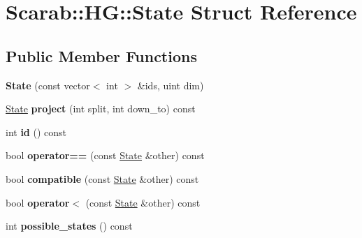 \hypertarget{structScarab_1_1HG_1_1State}{
\section{Scarab::HG::State Struct Reference}
\label{structScarab_1_1HG_1_1State}
}
\subsection*{Public Member Functions}
\begin{DoxyCompactItemize}
\item 
\hypertarget{structScarab_1_1HG_1_1State_a61592030e999341da1e674274db11307}{
{\bfseries State} (const vector$<$ int $>$ \&ids, uint dim)}
\label{structScarab_1_1HG_1_1State_a61592030e999341da1e674274db11307}

\item 
\hypertarget{structScarab_1_1HG_1_1State_a6597ae0951c6d0c9146ae6bd5b91b52f}{
\hyperlink{structScarab_1_1HG_1_1State}{State} {\bfseries project} (int split, int down\_\-to) const }
\label{structScarab_1_1HG_1_1State_a6597ae0951c6d0c9146ae6bd5b91b52f}

\item 
\hypertarget{structScarab_1_1HG_1_1State_ac7f5641edb1dd813dcac3b76be28d305}{
int {\bfseries id} () const }
\label{structScarab_1_1HG_1_1State_ac7f5641edb1dd813dcac3b76be28d305}

\item 
\hypertarget{structScarab_1_1HG_1_1State_a17d205eca9f3be9c01c7d41e3fe4d809}{
bool {\bfseries operator==} (const \hyperlink{structScarab_1_1HG_1_1State}{State} \&other) const }
\label{structScarab_1_1HG_1_1State_a17d205eca9f3be9c01c7d41e3fe4d809}

\item 
\hypertarget{structScarab_1_1HG_1_1State_acd8ef3e5bd73ec5034de0d70f2bb2492}{
bool {\bfseries compatible} (const \hyperlink{structScarab_1_1HG_1_1State}{State} \&other) const }
\label{structScarab_1_1HG_1_1State_acd8ef3e5bd73ec5034de0d70f2bb2492}

\item 
\hypertarget{structScarab_1_1HG_1_1State_abadb936b551a91d952af74b3bfc7d43d}{
bool {\bfseries operator$<$} (const \hyperlink{structScarab_1_1HG_1_1State}{State} \&other) const }
\label{structScarab_1_1HG_1_1State_abadb936b551a91d952af74b3bfc7d43d}

\item 
\hypertarget{structScarab_1_1HG_1_1State_afc65eeacc345b5396a673e4328cccc11}{
int {\bfseries possible\_\-states} () const }
\label{structScarab_1_1HG_1_1State_afc65eeacc345b5396a673e4328cccc11}

\end{DoxyCompactItemize}
